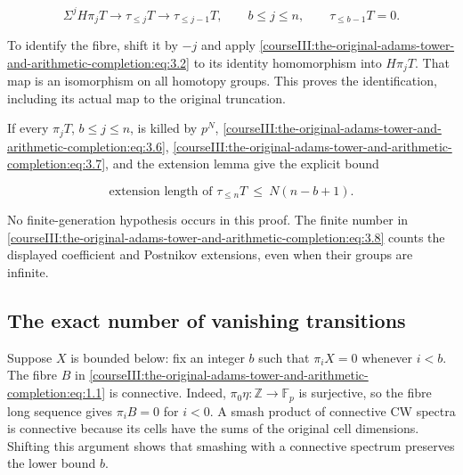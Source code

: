 \begin{equation}
\Sigma^jH\pi_jT\longrightarrow\tau_{\leq j}T
\longrightarrow\tau_{\leq j-1}T,
\qquad b\leq j\leq n,
\qquad \tau_{\leq b-1}T=0.
\label{courseIII:the-original-adams-tower-and-arithmetic-completion:eq:3.7}
\end{equation}

To identify the fibre, shift it by \(-j\) and apply \eqref{courseIII:the-original-adams-tower-and-arithmetic-completion:eq:3.2} to its identity homomorphism into \(H\pi_jT\). That map is an isomorphism on all homotopy groups. This proves the identification, including its actual map to the original truncation.

If every \(\pi_jT\), \(b\leq j\leq n\), is killed by \(p^N\), \eqref{courseIII:the-original-adams-tower-and-arithmetic-completion:eq:3.6}, \eqref{courseIII:the-original-adams-tower-and-arithmetic-completion:eq:3.7}, and the extension lemma give the explicit bound

\begin{equation}
\text{extension length of }\tau_{\leq n}T\ \leq\ N(n-b+1).
\label{courseIII:the-original-adams-tower-and-arithmetic-completion:eq:3.8}
\end{equation}

No finite-generation hypothesis occurs in this proof. The finite number in \eqref{courseIII:the-original-adams-tower-and-arithmetic-completion:eq:3.8} counts the displayed coefficient and Postnikov extensions, even when their groups are infinite.

\subsection{The exact number of vanishing transitions}
\label{courseIII:the-original-adams-tower-and-arithmetic-completion:arithmetic-vanishing-transitions}

\label{courseIII:the-original-adams-tower-and-arithmetic-completion:section-4}\label{courseIII:adams-arithmetic:4}

Suppose \(X\) is bounded below: fix an integer \(b\) such that \(\pi_iX=0\) whenever \(i<b\). The fibre \(B\) in \eqref{courseIII:the-original-adams-tower-and-arithmetic-completion:eq:1.1} is connective. Indeed, \(\pi_0\eta:\mathbb Z\to\mathbb F_p\) is surjective, so the fibre long sequence gives \(\pi_iB=0\) for \(i<0\). A smash product of connective CW spectra is connective because its cells have the sums of the original cell dimensions. Shifting this argument shows that smashing with a connective spectrum preserves the lower bound \(b\).


